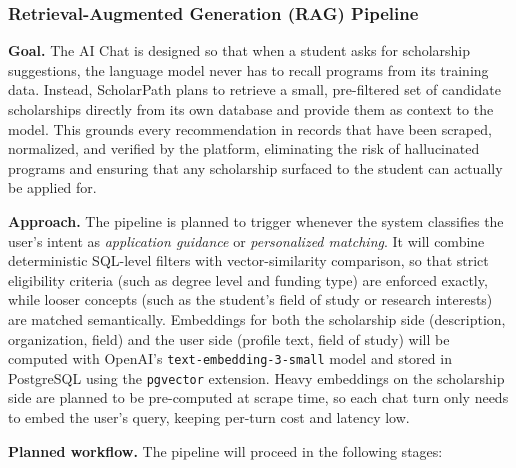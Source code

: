 \subsubsection{Retrieval-Augmented Generation (RAG) Pipeline}

\textbf{Goal.} The AI Chat is designed so that when a student asks for scholarship suggestions, the language model never has to recall programs from its training data. Instead, ScholarPath plans to retrieve a small, pre-filtered set of candidate scholarships directly from its own database and provide them as context to the model. This grounds every recommendation in records that have been scraped, normalized, and verified by the platform, eliminating the risk of hallucinated programs and ensuring that any scholarship surfaced to the student can actually be applied for.

\textbf{Approach.} The pipeline is planned to trigger whenever the system classifies the user's intent as \textit{application guidance} or \textit{personalized matching}. It will combine deterministic SQL-level filters with vector-similarity comparison, so that strict eligibility criteria (such as degree level and funding type) are enforced exactly, while looser concepts (such as the student's field of study or research interests) are matched semantically. Embeddings for both the scholarship side (description, organization, field) and the user side (profile text, field of study) will be computed with OpenAI's \texttt{text-embedding-3-small} model and stored in PostgreSQL using the \texttt{pgvector} extension. Heavy embeddings on the scholarship side are planned to be pre-computed at scrape time, so each chat turn only needs to embed the user's query, keeping per-turn cost and latency low.

\textbf{Planned workflow.} The pipeline will proceed in the following stages:

